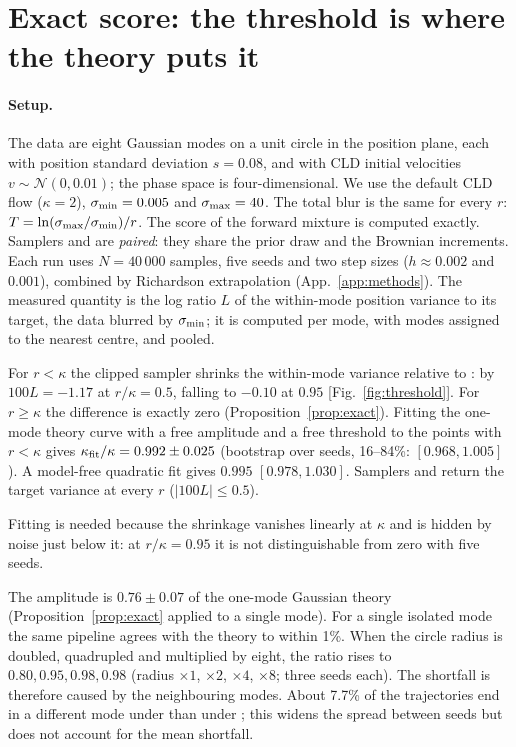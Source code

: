 \section{Exact score: the threshold is where the theory puts it}
\label{sec:exact}

\paragraph*{Setup.}
The data are eight Gaussian modes on a unit circle in the position plane, each with position standard deviation $s=0.08$, and with CLD initial velocities $v\sim\mathcal N(0,0.01)$; the phase space is four-dimensional.
We use the default CLD flow ($\kappa=2$), $\sigma_{\min}=0.005$ and $\sigma_{\max}=40$.
The total blur is the same for every $r$: $T=\ln(\sigma_{\max}/\sigma_{\min})/r$.
The score of the forward mixture is computed exactly.
Samplers \Sa{} and \Sb{} are \emph{paired}: they share the prior draw and the Brownian increments.
Each run uses $N=40\,000$ samples, five seeds and two step sizes ($h\approx0.002$ and $0.001$), combined by Richardson extrapolation (App.~\ref{app:methods}).
The measured quantity is the log ratio $L$ of the within-mode position variance to its target, the data blurred by $\sigma_{\min}$; it is computed per mode, with modes assigned to the nearest centre, and pooled.

\begin{observation}
\label{obs:threshold}
For $r<\kappa$ the clipped sampler shrinks the within-mode variance relative to \Sb{}: by $100L=-1.17$ at $r/\kappa=0.5$, falling to $-0.10$ at $0.95$ [Fig.~\ref{fig:threshold}].
For $r\geq\kappa$ the difference is exactly zero (Proposition~\ref{prop:exact}).
Fitting the one-mode theory curve with a free amplitude and a free threshold to the points with $r<\kappa$ gives $\kappa_{\rm fit}/\kappa = 0.992 \pm 0.025$ (bootstrap over seeds, 16--84\%: $[0.968, 1.005]$).
A model-free quadratic fit gives $0.995$ $[0.978, 1.030]$.
Samplers \Sb{} and \Sc{} return the target variance at every $r$ ($|100L|\leq 0.5$).
\end{observation}

Fitting is needed because the shrinkage vanishes linearly at $\kappa$ and is hidden by noise just below it: at $r/\kappa=0.95$ it is not distinguishable from zero with five seeds.

\begin{observation}
\label{obs:amplitude}
The amplitude is $0.76\pm0.07$ of the one-mode Gaussian theory (Proposition~\ref{prop:exact} applied to a single mode).
For a single isolated mode the same pipeline agrees with the theory to within 1\%.
When the circle radius is doubled, quadrupled and multiplied by eight, the ratio rises to $0.80, 0.95, 0.98, 0.98$ (radius $\times1$, $\times2$, $\times4$, $\times8$; three seeds each).
The shortfall is therefore caused by the neighbouring modes.
About 7.7\% of the trajectories end in a different mode under \Sa{} than under \Sb{}; this widens the spread between seeds but does not account for the mean shortfall.
\end{observation}

